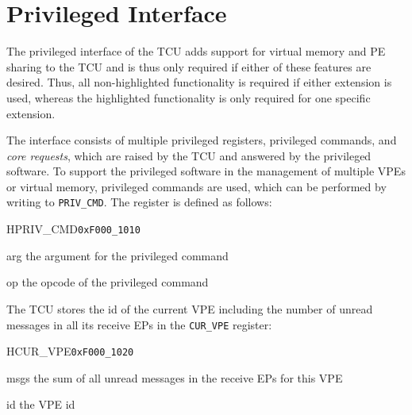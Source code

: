 \chapter{Privileged Interface}

The privileged interface of the TCU adds support for virtual memory and PE sharing to the TCU and is
thus only required if either of these features are desired. Thus, all non-highlighted functionality
is required if either extension is used, whereas the highlighted functionality is only required for
one specific extension.

The interface consists of multiple privileged registers, privileged commands, and \emph{core
requests}, which are raised by the TCU and answered by the privileged software. To support the
privileged software in the management of multiple VPEs or virtual memory, privileged commands are
used, which can be performed by writing to \texttt{PRIV\_CMD}. The register is defined as follows:

\begin{register}{H}{PRIV\_CMD}{\texttt{0xF000\_1010}}
  \regnewline%
  \begin{regdesc}\begin{reglist}
    \item[arg] the argument for the privileged command
    \item[op] the opcode of the privileged command
  \end{reglist}\end{regdesc}
\end{register}

\noindent The TCU stores the id of the current VPE including the number of unread messages in all
its receive EPs in the \texttt{CUR\_VPE} register:

\setlength{\regWidth}{.95\textwidth}
\begin{register}{H}{CUR\_VPE}{\texttt{0xF000\_1020}}
  \regnewline%
  \begin{regdesc}\begin{reglist}
    \item[msgs] the sum of all unread messages in the receive EPs for this VPE
    \item[id] the VPE id
  \end{reglist}\end{regdesc}
\end{register}
\setlength{\regWidth}{\textwidth}
\extend{}

